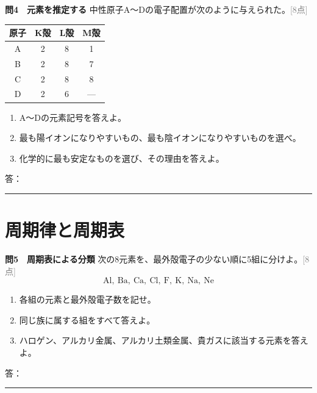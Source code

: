 \documentclass[11pt,a4paper]{ctexart}
\newcommand{\blank}[1]{\rule{#1}{0.4pt}}
\newcommand{\score}[1]{\hfill\textcolor{gray}{[#1点]}}
\newcommand{\ansspace}[1]{\par\vspace{#1}}
\newenvironment{qbox}{\begin{list}{}{\setlength{\leftmargin}{0pt}}\item\begin{minipage}{\linewidth}}{\end{minipage}\end{list}\vspace{3mm}}
\begin{document}
\begin{qbox}
\textbf{問4　元素を推定する}
\quad 中性原子A～Dの電子配置が次のように与えられた。\score{8}
\begin{center}
\begin{tabular}{c|c|c|c}
\toprule
原子 & K殻 & L殻 & M殻\\ \midrule
A & 2 & 8 & 1\\
B & 2 & 8 & 7\\
C & 2 & 8 & 8\\
D & 2 & 6 & ---\\
\bottomrule
\end{tabular}
\end{center}
\begin{enumerate}[label=(\arabic*),leftmargin=9mm]
\item A～Dの元素記号を答えよ。
\item 最も陽イオンになりやすいもの、最も陰イオンになりやすいものを選べ。
\item 化学的に最も安定なものを選び、その理由を答えよ。
\end{enumerate}
答：\blank{150mm}\ansspace{5mm}
\end{qbox}

\section{周期律と周期表}

\begin{qbox}
\textbf{問5　周期表による分類}
\quad 次の8元素を、最外殻電子の少ない順に5組に分けよ。\score{8}
\[
\mathrm{Al},\ \mathrm{Ba},\ \mathrm{Ca},\ \mathrm{Cl},\ \mathrm{F},\ \mathrm{K},\ \mathrm{Na},\ \mathrm{Ne}
\]
\begin{enumerate}[label=(\arabic*),leftmargin=9mm]
\item 各組の元素と最外殻電子数を記せ。
\item 同じ族に属する組をすべて答えよ。
\item ハロゲン、アルカリ金属、アルカリ土類金属、貴ガスに該当する元素を答えよ。
\end{enumerate}
答：\blank{150mm}\ansspace{8mm}
\end{qbox}
\end{document}
